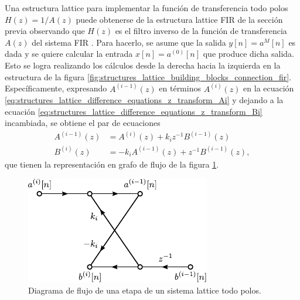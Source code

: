 \documentclass[a4paper]{report}
\begin{document}
Una estructura lattice para implementar la función de transferencia todo polos \(H(z)=1/A(z)\) puede obtenerse de la estructura lattice FIR de la sección previa observando que \(H(z)\) es el filtro inverso de la función de transferencia \(A(z)\) del sistema FIR . Para hacerlo, se asume que la salida \(y[n]=a^{M}[n]\) es dada y se quiere calcular la entrada \(x[n]=a^{(0)}[n]\) que produce dicha salida. Esto se logra realizando los cálculos desde la derecha hacia la izquierda en la estructura de la figura \ref{fig:structures_lattice_building_blocks_connection_fir}. Específicamente, expresando \(A^{(i-1)}(z)\) en términos \(A^{(i)}(z)\) en la ecuación \ref{eq:structures_lattice_difference_equations_z_transform_Ai} y dejando a la ecuación \ref{eq:structures_lattice_difference_equations_z_transform_Bi} incambiada, se obtiene el par de ecuaciones
\begin{align}
 A^{(i-1)}(z)&=A^{(i)}(z)+k_iz^{-1}B^{(i-1)}(z)
 \label{eq:structures_lattice_all_poles_difference_equations_z_transform_Ai}\\
 B^{(i)}(z)&=-k_iA^{(i-1)}(z)+z^{-1}B^{(i-1)}(z)
 \label{eq:structures_lattice_all_poles_difference_equations_z_transform_Bi},
\end{align}
que tienen la representación en grafo de flujo de la figura \ref{fig:structures_lattice_all_poles_building_blocks}. 
\begin{figure}[!htb]
  \begin{minipage}[c]{0.43\textwidth}
    \includegraphics[width=\textwidth]{figuras/structures_lattice_all_poles_building_blocks.pdf}
  \end{minipage}\hfill
  \begin{minipage}[c]{0.47\textwidth}
    \caption{
     Diagrama de flujo de una etapa de un sistema lattice todo polos.
    }\label{fig:structures_lattice_all_poles_building_blocks}
  \end{minipage}
\end{figure}
\end{document}

